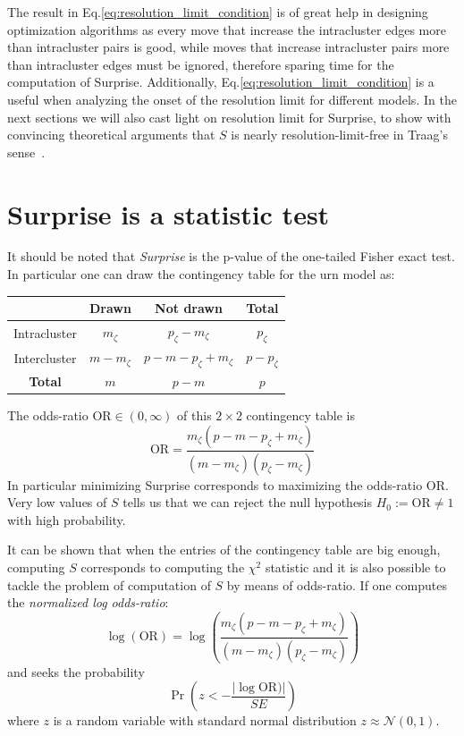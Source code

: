 The result in Eq.\ref{eq:resolution_limit_condition} is of great help in designing optimization algorithms as every move that increase the intracluster edges more than intracluster pairs is good, while moves that increase intracluster pairs more than intracluster edges must be ignored, therefore sparing time for the computation of Surprise. Additionally, Eq.\ref{eq:resolution_limit_condition} is a useful when analyzing the onset of the resolution limit for different models.
In the next sections we will also cast light on resolution limit for Surprise, to show with convincing theoretical arguments that $S$ is nearly resolution-limit-free in Traag's sense~\cite{traag2015}.

\section{Surprise is a statistic test}\label{sec:surprisefishertest}
It should be noted that \emph{Surprise} is the p-value of the one-tailed Fisher exact test. In particular one can draw the contingency table for the urn model as:

\begin{table}[htb]
\centering
\begin{tabular}{|c|c|c|c|}
\hline
 & Drawn & Not drawn & \textbf{Total}\\
\hline
Intracluster & $m_\zeta$ & $p_\zeta-m_\zeta$ & $p_\zeta$\\
\hline
Intercluster & $m-m_\zeta$ & $p-m-p_\zeta+m_\zeta$ & $p-p_\zeta$ \\
\hline
\textbf{Total} & $m$ & $p-m$ & $p$ \\
\hline
\end{tabular}
\end{table}
The odds-ratio $\textrm{OR} \in (0,\infty)$ of this $2\times 2$ contingency table is
\begin{equation}
\textrm{OR} = \frac{m_\zeta(p-m-p_\zeta+m_\zeta)}{(m-m_\zeta)(p_\zeta-m_\zeta)} 
\end{equation}
In particular minimizing Surprise corresponds to maximizing the odds-ratio $\textrm{OR}$. Very low values of $S$ tells us that we can reject the null hypothesis $H_0 := \textrm{OR} \neq 1$ with high probability.

It can be shown that when the entries of the contingency table are big enough, computing $S$ corresponds to computing the $\chi^2$ statistic and it is also possible to tackle the problem of computation of $S$ by means of odds-ratio.
If one computes the \emph{normalized log odds-ratio}:
\begin{equation}
\log(\textrm{OR}) = \log\left( \frac{m_\zeta(p-m-p_\zeta+m_\zeta)}{(m-m_\zeta)(p_\zeta-m_\zeta)} \right )
\end{equation}
and seeks the probability
\begin{equation}
\Pr\left(z < -\frac{|\log\textrm{OR})|}{SE} \right)
\end{equation}
where $z$ is a random variable with standard normal distribution $z \approx \mathcal{N}(0,1)$.